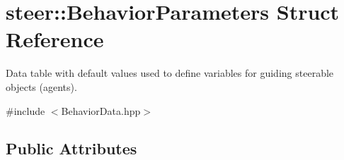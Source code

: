 \hypertarget{structsteer_1_1_behavior_parameters}{\section{steer\-:\-:Behavior\-Parameters Struct Reference}
\label{structsteer_1_1_behavior_parameters}
}


Data table with default values used to define variables for guiding steerable objects (agents).  




{\ttfamily \#include $<$Behavior\-Data.\-hpp$>$}

\subsection*{Public Attributes}
